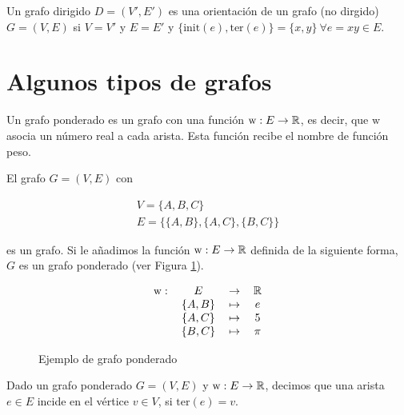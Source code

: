 \begin{defi}\label{def:orientacion}
Un grafo dirigido $D = (V', E')$ es una orientación de un grafo (no dirgido) $G = (V,E)$ si $V = V'$ y $E = E'$ y $\{\mathrm{init}(e), \mathrm{ter}(e) \} = \{x,y\} \ \forall e = xy \in E$.
\end{defi}

\section{Algunos tipos de grafos}

\begin{defi}
Un grafo ponderado es un grafo con una función $\mathrm{w} : E \to \mathbb{R}$, es decir, que $\mathrm{w}$ asocia un número real a cada arista. Esta función recibe el nombre de función peso.
\end{defi}

\begin{ejemplo}
El grafo $G = (V,E)$ con 

\begin{eqnarray}
V = \{A, B, C\}\\
E = \{ \{A,B\}, \{A,C\}, \{B,C\} \}
\end{eqnarray} 

es un grafo. Si le añadimos la función $\mathrm{w} : E \to \mathbb{R}$ definida de la siguiente forma, $G$ es un grafo ponderado (ver Figura \ref{fig:grafo_ponderado}).

\begin{equation*}
\begin{tabular}{r c c c}
$\mathrm{w}:$ & $E$ & $\to$ & $\R$\\
			     & $\{A,B\}$ & $\mapsto$ & $e$\\
			     & $\{A,C\}$ & $\mapsto$ & $5$\\
			     & $\{B,C\}$ & $\mapsto$ & $\pi$
			      
\end{tabular}
\end{equation*}
\begin{figure}[htb]
\centering
\ejemplografoponderado
\caption{Ejemplo de grafo ponderado}
\label{fig:grafo_ponderado}
\end{figure} 
\end{ejemplo}

\begin{defi}
Dado un grafo ponderado $G = (V,E)$ y $\mathrm{w} : E \to \mathbb{R}$, decimos que una arista $e \in E$ incide en el vértice $v \in V$, si $\mathrm{ter}(e) = v$. 
\end{defi}


